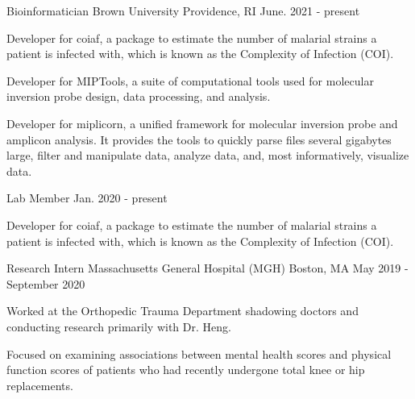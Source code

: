 
\begin{cventries}

  \cventry
    {Bioinformatician} %
    {Brown University} %
    {Providence, RI} %
    {June. 2021 - present} %
    {
      \begin{cvitems} %
        \item {Developer for coiaf, a package to estimate the number of malarial
        strains a patient is infected with, which is known as the Complexity of
        Infection (COI).}
        \item {Developer for MIPTools, a suite of computational tools used for
        molecular inversion probe design, data processing, and analysis.}
        \item {Developer for miplicorn, a unified framework for molecular
        inversion probe and amplicon analysis. It provides the tools to quickly
        parse files several gigabytes large, filter and manipulate data,
        analyze data, and, most informatively, visualize data.}
      \end{cvitems}
    }

\cventry
    {Lab Member} %
    {} %
    {} %
    {Jan. 2020 - present} %
    {
      \begin{cvitems} %
        \item {Developer for coiaf, a package to estimate the number of malarial
        strains a patient is infected with, which is known as the Complexity of
        Infection (COI).}
      \end{cvitems}
    }

  \cventry
    {Research Intern} %
    {Massachusetts General Hospital (MGH)} %
    {Boston, MA} %
    {May 2019 - September 2020} %
    {
      \begin{cvitems} %
        \item {Worked at the Orthopedic Trauma Department shadowing doctors and conducting research primarily with Dr. Heng.} 
        \item {Focused on examining associations between mental health scores
        and physical function scores of patients who had recently undergone total knee or hip replacements.}
      \end{cvitems}
    }


\end{cventries}
